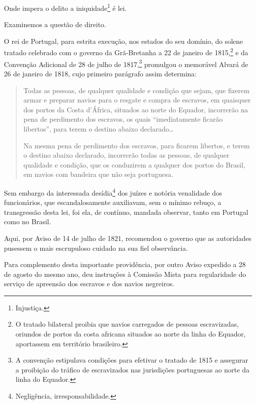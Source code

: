 Onde impera o delito a iniquidade\footnote{Injustiça.} é lei.

Examinemos a questão de direito.

O rei de Portugal, para estrita execução, nos estados do seu domínio, do
solene tratado celebrado com o governo da Grã-Bretanha a 22 de janeiro
de 1815,\footnote{O tratado bilateral proibia que navios carregados de
  pessoas escravizadas, oriundos de portos da costa africana situados ao
  norte da linha do Equador, aportassem em território brasileiro.} e da
Convenção Adicional de 28 de julho de 1817,\footnote{A convenção
  estipulava condições para efetivar o tratado de 1815 e assegurar a
  proibição do tráfico de escravizados nas jurisdições portuguesas ao
  norte da linha do Equador.} promulgou o memorável Alvará de 26 de
janeiro de 1818, cujo primeiro parágrafo assim determina:

\begin{quote}
Todas as pessoas, de qualquer qualidade e condição que sejam, que
fizerem armar e preparar navios para o resgate e compra de escravos, em
quaisquer dos portos da Costa d'África, situados ao norte do Equador,
incorrerão na pena de perdimento dos escravos, os quais ``imediatamente
ficarão libertos'', para terem o destino abaixo declarado\ldots{}

Na mesma pena de perdimento dos escravos, para ficarem libertos, e terem
o destino abaixo declarado, incorrerão todas as pessoas, de qualquer
qualidade e condição, que os conduzirem a qualquer dos portos do Brasil,
em navios com bandeira que não seja portuguesa.
\end{quote}

\asterisc

Sem embargo da interessada desídia\footnote{Negligência,
  irresponsabilidade.} dos juízes e notória venalidade dos funcionários,
que escandalosamente auxiliavam, sem o mínimo rebuço, a transgressão
desta lei, foi ela, de contínuo, mandada observar, tanto em Portugal
como no Brasil.

Aqui, por Aviso de 14 de julho de 1821, recomendou o governo que as
autoridades pusessem o mais escrupuloso cuidado na sua fiel observância.

Para complemento desta importante providência, por outro Aviso expedido
a 28 de agosto do mesmo ano, deu instruções à Comissão Mista para
regularidade do serviço de apreensão dos escravos e dos navios
negreiros.

